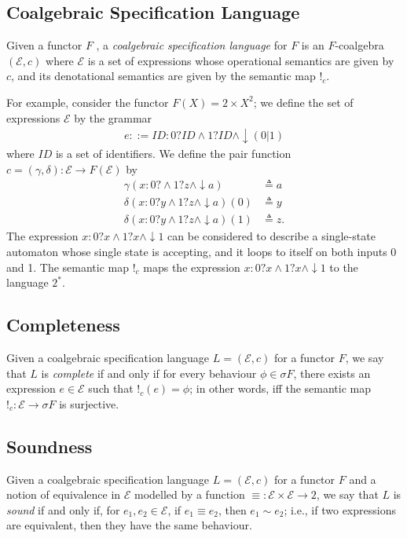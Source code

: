 \subsection{Coalgebraic Specification Language}
Given a functor $F$
, a \emph{coalgebraic specification language} for $F$ is an $F$-coalgebra $(\mathcal{E},c)$ where $\mathcal{E}$ is a set of expressions whose operational semantics are given by $c$, and its denotational semantics are given by the semantic map $!_c$.

For example, consider the functor $F(X)=2\times X^2$; we define the set of expressions $\mathcal{E}$ by the grammar
\begin{align}
    e::= ID:0?ID\land1?ID\land\downarrow (0|1)
\end{align}
where $ID$ is a set of identifiers. We define the pair function $c=(\gamma,\delta)\colon \mathcal{E}\rightarrow F(\mathcal{E})$ by 
\begin{align*}
    \gamma(x:0?\land1?z\land\downarrow a)&\triangleq a\\
    \delta(x:0?y\land1?z\land\downarrow a)(0)&\triangleq y\\
    \delta(x:0?y\land1?z\land\downarrow a)(1)&\triangleq z.
\end{align*}
The expression $x:0?x\land1?x\land\downarrow 1$ can be considered to describe a single-state automaton whose single state is  accepting, and it loops to itself on both inputs 0 and 1. The semantic map $!_c$ maps the expression $x:0?x\land1?x\land\downarrow 1$ to the language $2^*$.%

\subsection{Completeness}
Given a coalgebraic specification language $L=(\mathcal{E},c)$ for a functor $F$, 
we say that $L$ is \emph{complete} if and only if for every behaviour $\phi\in \sigma F$, there exists an expression $e\in \mathcal{E}$ such that $!_c(e)=\phi$; in other words, iff the semantic map $!_c\colon \mathcal{E}\rightarrow \sigma F$ is surjective.

\subsection{Soundness}
Given a coalgebraic specification language $L=(\mathcal{E},c)$ for a functor $F$ and a notion of equivalence in $\mathcal{E}$ modelled by a function $\equiv \colon \mathcal{E}\times \mathcal{E}\rightarrow 2$, we say that $L$ is \emph{sound} if and only if, for $e_1, e_2\in \mathcal{E}$, if $e_1\equiv e_2$, then $e_1\sim e_2$; i.e., if two expressions are equivalent, then they have the same behaviour.

